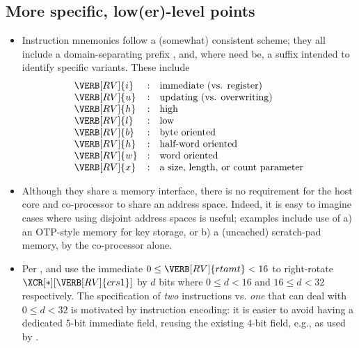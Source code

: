 
\subsection{More specific,  low(er)-level points}
\label{appx:discuss:lo}

\begin{itemize}

\item Instruction mnemonics follow a (somewhat) consistent scheme; they
      all include a domain-separating prefix , and, where
      need be, a suffix intended to identify specific variants.  These 
      include
      \[
      \begin{array}{lcl}
      \VERB[RV]{i} &:& \mbox{immediate (vs. register)   }        \\
      \VERB[RV]{u} &:& \mbox{updating  (vs. overwriting)}        \\
      \VERB[RV]{h} &:& \mbox{high}                               \\
      \VERB[RV]{l} &:& \mbox {low}                               \\
      \VERB[RV]{b} &:& \mbox     {byte oriented}                 \\
      \VERB[RV]{h} &:& \mbox{half-word oriented}                 \\
      \VERB[RV]{w} &:& \mbox     {word oriented}                 \\
      \VERB[RV]{x} &:& \mbox{a size, length, or count parameter} \\
      \end{array}
      \]
\item Although they share a memory interface, there is no requirement for
      the host core and co-processor to share an address space.  Indeed,
      it is easy to imagine cases where using disjoint address spaces is
      useful; examples include use of
      a) an OTP-style memory for key storage, 
         or
      b) a (uncached) scratch-pad memory,
      by the co-processor alone.
\item Per , 
      and
      use the immediate 
      $ 
      0 \leq \VERB[RV]{rtamt} < 16 
      $ 
      to right-rotate $\XCR[*][{\VERB[RV]{crs1}}]$ by $d$ bits where
      $0  \leq d < 16$
      and
      $16 \leq d < 32$
      respectively.
      The specification of {\em two} instructions vs. {\em one} that can
      deal with 
      $0  \leq d < 32$
      is motivated by instruction encoding: it is easier to avoid having
      a dedicated $5$-bit immediate field, reusing the existing $4$-bit
      field, e.g., as used by
      .

\end{itemize}

